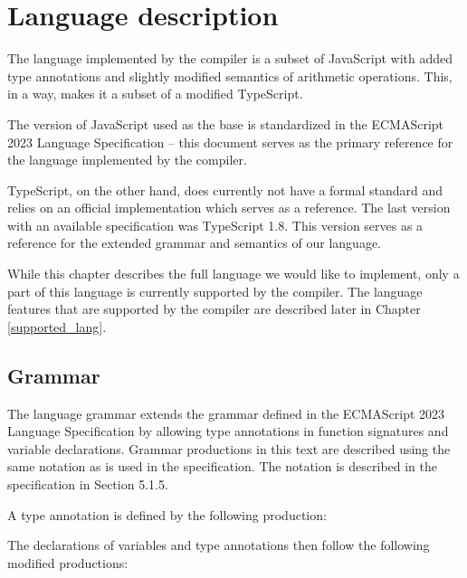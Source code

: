 \chapter{Language description}\label{language}

The language implemented by the compiler is a subset of JavaScript with added type annotations and slightly modified semantics of arithmetic operations. This, in a way, makes it a subset of a modified TypeScript.

The version of JavaScript used as the base is standardized in the ECMAScript 2023 Language Specification\cite{ecma262} -- this document serves as the primary reference for the language implemented by the compiler.

TypeScript, on the other hand, does currently not have a formal standard and relies on an official implementation which serves as a reference. The last version with an available specification was TypeScript 1.8\cite{typescript18}. This version serves as a reference for the extended grammar and semantics of our language.

While this chapter describes the full language we would like to implement, only a part of this language is currently supported by the compiler. The language features that are supported by the compiler are described later in Chapter \ref{supported_lang}.


\section{Grammar}\label{lang:grammar}

The language grammar extends the grammar defined in the ECMAScript 2023 Language Specification\cite{ecma262} by allowing type annotations in function signatures and variable declarations. Grammar productions in this text are described using the same notation as is used in the specification. The notation is described in the specification in Section 5.1.5.

A type annotation is defined by the following production:

\GrammarRule[TypeAnnotation]{}{
    \terminal{:} \nonterminal[Identifier]{}{}
}


The declarations of variables and type annotations then follow the following modified productions:




